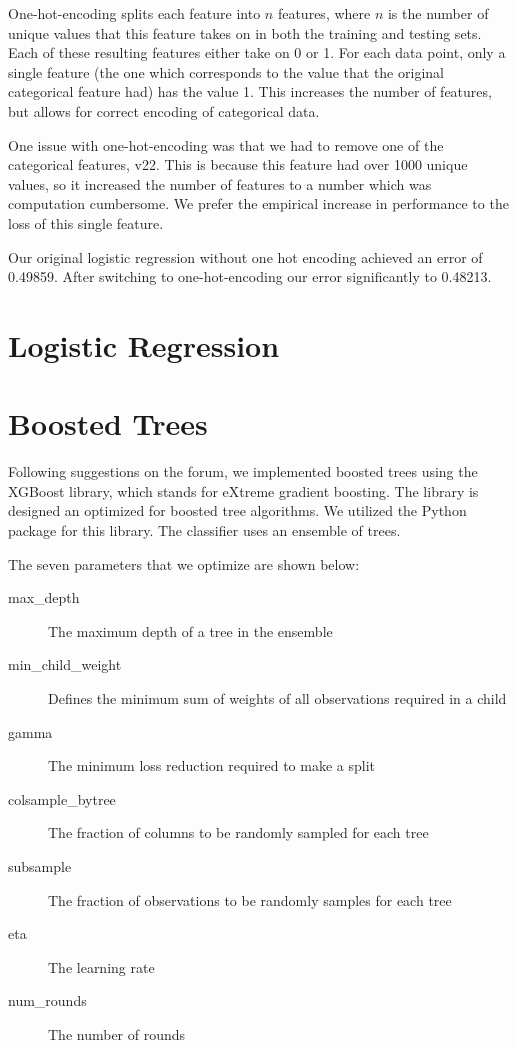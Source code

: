 \documentclass[twoside,11pt]{article}
\theoremstyle{definition}
\begin{document}
    One-hot-encoding splits each feature into $n$ features, where $n$ is the number of unique values that this feature takes on in both the training and testing sets. Each of these resulting features either take on 0 or 1. For each data point, only a single feature (the one which corresponds to the value that the original categorical feature had) has the value 1. This increases the number of features, but allows for correct encoding of categorical data.

    One issue with one-hot-encoding was that we had to remove one of the categorical features, v22. This is because this feature had over 1000 unique values, so it increased the number of features to a number which was computation cumbersome. We prefer the empirical increase in performance to the loss of this single feature.

    Our original logistic regression without one hot encoding achieved an error of 0.49859. After switching to one-hot-encoding our error significantly to 0.48213.

\section{Logistic Regression}

\section{Boosted Trees}

  Following suggestions on the forum, we implemented boosted trees using the XGBoost library, which stands for eXtreme gradient boosting. The library is designed an optimized for boosted tree algorithms. We utilized the Python package for this library. The classifier uses an ensemble of trees.

  The seven parameters that we optimize are shown below:

  \begin{description}
    \item[max\_depth] The maximum depth of a tree in the ensemble
    \item[min\_child\_weight] Defines the minimum sum of weights of all observations required in a child
    \item[gamma] The minimum loss reduction required to make a split
    \item[colsample\_bytree] The fraction of columns to be randomly sampled for each tree
    \item[subsample] The fraction of observations to be randomly samples for each tree
    \item[eta] The learning rate
    \item[num\_rounds] The number of rounds
  \end{description}
\end{document}

